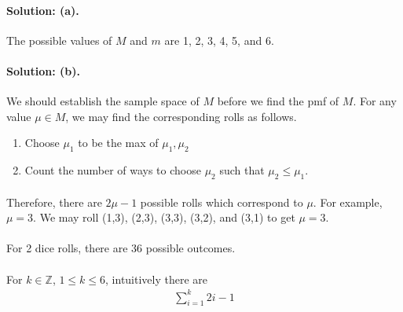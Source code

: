 \documentclass{article}
\begin{document}
\paragraph{Solution: (a).} The possible values of $M$ and $m$ are 1, 2, 3, 4, 5, and 6.
\paragraph{Solution: (b).} We should establish the sample space of $M$ before we find the pmf of $M$.
For any value $\mu \in M$, we may find the corresponding rolls as follows.
\begin{enumerate}
    \item Choose $\mu_1$ to be the max of $\mu_1, \mu_2$
    \item Count the number of ways to choose $\mu_2$ such that $\mu_2 \le \mu_1$.
    \end{enumerate}
\paragraph{}Therefore, there are $2\mu - 1$ possible rolls which correspond to $\mu$. For example, $\mu = 3$.
We may roll (1,3), (2,3), (3,3), (3,2), and (3,1) to get $\mu = 3$.

\paragraph{}For 2 dice rolls, there are 36 possible outcomes.

\paragraph{}For $k \in \mathbb{Z}$, $1\le k\le6$, intuitively there are
\begin{align*}
    \sum_{i=1}^{k} 2i - 1
\end{align*}
\end{document}
